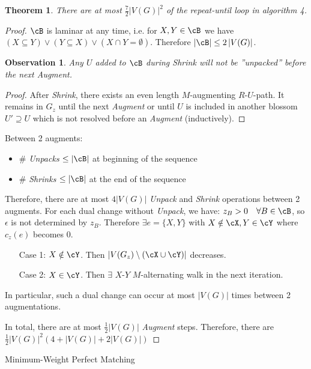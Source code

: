 \documentclass[11pt, a4paper]{article}
\newcommand{\abs}[1]{\left\lvert#1\right\rvert}
\newcommand{\set}[1]{\{#1\}}
\newtheorem{theorem}{Theorem}[section]
\newtheorem*{observation}{Observation}
\theoremstyle{remark}
\theoremstyle{definition}
\begin{document}
\begin{theorem}\label{thm:min-weight-matching-it}
There are at most $\frac{7}{2}\abs{V(G)}^2$ of the repeat-until loop
in algorithm 4.
\end{theorem}
\begin{proof}
$\cB$ is laminar at any time, i.e. for $X,Y\in\cB$ we have
$(X\subseteq Y)\lor (Y\subseteq X)\lor (X\cap Y=\emptyset)$. Therefore
$\abs{\cB}\leq 2\abs{V(G)}$.
\begin{observation}
Any $U$ added to $\cB$ during \emph{Shrink} will not be ''unpacked'' before
the next \emph{Augment}.
\end{observation}
\begin{proof}
After \emph{Shrink}, there exists an even length $M$-augmenting $R$-$U$-path.
It remains in $G_z$ until the next \emph{Augment} or until $U$ is included
in another blossom $U'\supseteq U$ which is not resolved before an
\emph{Augment} (inductively).
\end{proof}

Between 2 augments:
\begin{itemize}
	\item $\#$ \emph{Unpacks} $\leq \abs{\cB}$ at beginning of the sequence
	\item $\#$ \emph{Shrinks} $\leq \abs{\cB}$ at the end of the sequence
\end{itemize}
Therefore, there are at most $4\abs{V(G)}$ \emph{Unpack} and \emph{Shrink} operations
between 2 augments. For each dual change without \emph{Unpack}, we have:
$z_B>0\quad \forall B\in\cB$, so $\epsilon$ is not determined by $z_B$.
Therefore $\exists e=\set{X,Y}$ with $X\notin\cX, Y\in\cY$ where
$c_z(e)$ becomes 0.
\begin{enumerate}
	\item[Case 1:] $X\notin\cY$. Then $\abs{V(G_z)\setminus(\cX\cup\cY)}$
	decreases.
	\item[Case 2:] $X\in\cY$. Then $\exists$ $X$-$Y$ $M$-alternating walk
	in the next iteration.
\end{enumerate}
In particular, such a dual change can occur at most $\abs{V(G)}$ times
between 2 augmentations.

In total, there are at most $\frac{1}{2}\abs{V(G)}$ \emph{Augment} steps.
Therefore, there are $\frac{1}{2}\abs{V(G)}^2(4+\abs{V(G)}+2\abs{V(G)})$
\end{proof}

\begin{algorithm}
\caption{Minimum-Weight Perfect Matching}

\end{algorithm}
\end{document}
